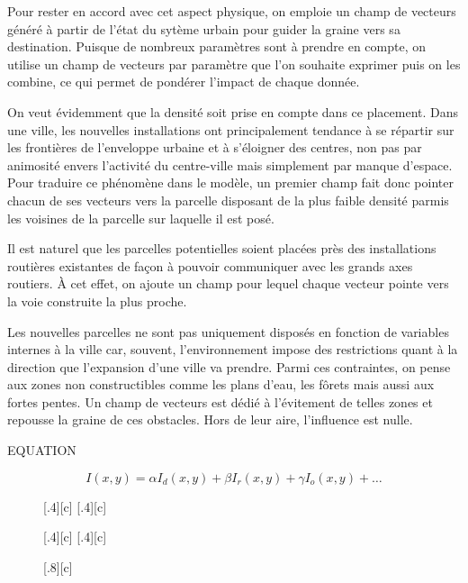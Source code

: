 \documentclass[12pt]{article}
\begin{document}
Pour rester en accord avec cet aspect physique, on emploie un champ de
vecteurs généré à partir de l'état du sytème urbain pour guider la
graine vers sa destination. Puisque de nombreux paramètres sont à
prendre en compte, on utilise un champ de vecteurs par paramètre que
l'on souhaite exprimer puis on les combine, ce qui permet de pondérer
l'impact de chaque donnée.

On veut évidemment que la densité soit prise en compte dans ce
placement. Dans une ville, les nouvelles installations ont
principalement tendance à se répartir sur les frontières de
l'enveloppe urbaine et à s'éloigner des centres, non pas par animosité
envers l'activité du centre-ville mais simplement par manque
d'espace. Pour traduire ce phénomène dans le modèle, un premier champ
fait donc pointer chacun de ses vecteurs vers la parcelle disposant de
la plus faible densité parmis les voisines de la parcelle sur laquelle
il est posé.

Il est naturel que les parcelles potentielles soient placées près des
installations routières existantes de façon à pouvoir communiquer avec
les grands axes routiers. À cet effet, on ajoute un champ pour lequel
chaque vecteur pointe vers la voie construite la plus proche.

Les nouvelles parcelles ne sont pas uniquement disposés en fonction de
variables internes à la ville car, souvent, l'environnement impose des
restrictions quant à la direction que l'expansion d'une ville va
prendre. Parmi ces contraintes, on pense aux zones non constructibles
comme les plans d'eau, les fôrets mais aussi aux fortes pentes. Un
champ de vecteurs est dédié à l'évitement de telles zones et repousse la
graine de ces obstacles. Hors de leur aire, l'influence est nulle.

EQUATION

\begin{equation*}
  I(x,y) = \alpha I_d(x,y) + \beta I_r(x,y) + \gamma I_o(x,y) + \dots
\end{equation*}

\begin{figure}[!ht]
  \centering
  [.4\linewidth][c]{
  }
  [.4\linewidth][c]{
  }

  [.4\linewidth][c]{
  }
  [.4\linewidth][c]{
  }

  [.8\linewidth][c]{
  }
  \caption{}
  \label{fig:fields}
\end{figure}
\end{document}
